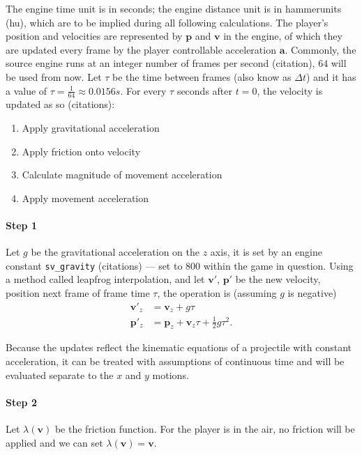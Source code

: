\documentclass[a4paper,11pt]{article}
\newcommand{\tvec}[1]{\boldsymbol{#1}}
\newcommand{\ta}{\tvec{a}}
\newcommand{\tv}{\tvec{v}}
\newcommand{\tp}{\tvec{p}}
\begin{document}
The engine time unit is in seconds; the engine distance unit is in hammerunits (hu), which are to be implied during all following calculations. The player's position and velocities are represented by $\tp$ and $\tv$ in the engine, of which they are updated every frame by the player controllable acceleration $\ta$. Commonly, the source engine runs at an integer number of frames per second (citation), $64$ will be used from now. Let $\tau$ be the time between frames (also know as $\Delta t$) and it has a value of $\tau = \frac{1}{64} \approx 0.0156 \si{s}$. For every $\tau$ seconds after $t=0$, the velocity is updated as so (citations):
\begin{enumerate}
    \item Apply gravitational acceleration
    \item Apply friction onto velocity
    \item Calculate magnitude of movement acceleration
    \item Apply movement acceleration
\end{enumerate}

\paragraph{Step 1} Let $g$ be the gravitational acceleration on the $z$ axis, it is set by an engine constant \verb|sv_gravity| (citations) --- set to $800$ within the game in question. Using a method called leapfrog interpolation, and let $\tv'$, $\tp'$ be the new velocity, position next frame of frame time $\tau$, the operation is (assuming $g$ is negative)
\begin{align}
    \tv'_z &= \tv_z + g\tau \label{eq:gv}\\
    \tp'_z &= \tp_z + \tv_z\tau + \frac{1}{2}g\tau^2 \label{eq:gp}.
\end{align}

Because the updates reflect the kinematic equations of a projectile with constant acceleration, it can be treated with assumptions of continuous time and will be evaluated separate to the $x$ and $y$ motions.


\paragraph{Step 2} Let $\lambda(\tv)$ be the friction function. For the player is in the air, no friction will be applied and we can set $\lambda(\tv) = \tv$.
\end{document}
